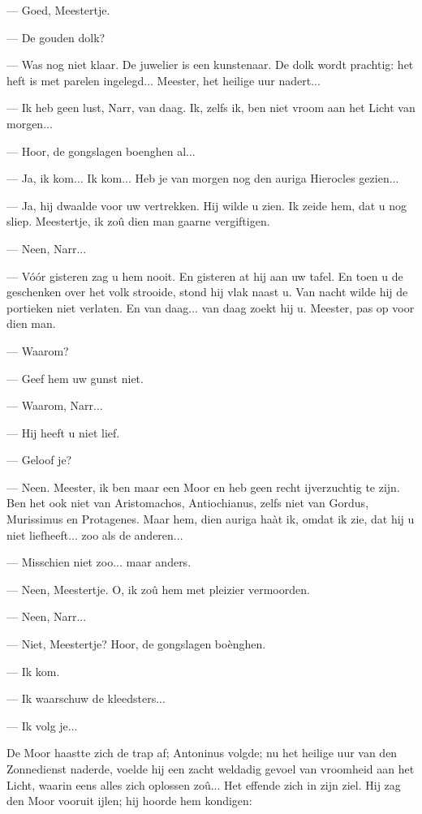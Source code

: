 \documentclass[a4paper, 12pt, oneside, dutch]{article}
\begin{document}
--- Goed, Meestertje.

--- De gouden dolk?

--- Was nog niet klaar. De juwelier is een kunstenaar. De dolk wordt prachtig: het heft is met parelen ingelegd... Meester, het heilige uur nadert...

--- Ik heb geen lust, Narr, van daag. Ik, zelfs ik, ben niet vroom aan het Licht van morgen...

--- Hoor, de gongslagen boenghen al...

--- Ja, ik kom... Ik kom... Heb je van morgen nog den auriga Hierocles gezien...

--- Ja, hij dwaalde voor uw vertrekken. Hij wilde u zien. Ik zeide hem, dat u nog sliep. Meestertje, ik zoû dien man gaarne vergiftigen.

--- Neen, Narr...

--- Vóór gisteren zag u hem nooit. En gisteren at hij aan uw tafel. En toen u de geschenken over het volk strooide, stond hij vlak naast u. Van nacht wilde hij de portieken niet verlaten. En van daag... van daag zoekt hij u. Meester, pas op voor dien man.

--- Waarom?

--- Geef hem uw gunst niet.

--- Waarom, Narr...

--- Hij heeft u niet lief.

--- Geloof je?

--- Neen. Meester, ik ben maar een Moor en heb geen recht ijverzuchtig te zijn. Ben het ook niet van Aristomachos, Antiochianus, zelfs niet van Gordus, Murissimus en Protagenes. Maar hem, dien auriga haàt ik, omdat ik zie, dat hij u niet liefheeft... zoo als de anderen...

--- Misschien niet zoo... maar anders.

--- Neen, Meestertje. O, ik zoû hem met pleizier vermoorden.

--- Neen, Narr...

--- Niet, Meestertje? Hoor, de gongslagen boènghen.

--- Ik kom.

--- Ik waarschuw de kleedsters...

--- Ik volg je...

De Moor haastte zich de trap af; Antoninus volgde; nu het heilige uur van den Zonnedienst naderde, voelde hij een zacht weldadig gevoel van vroomheid aan het Licht, waarin eens alles zich oplossen zoû... Het effende zich in zijn ziel. Hij zag den Moor vooruit ijlen; hij hoorde hem kondigen:
\end{document}

